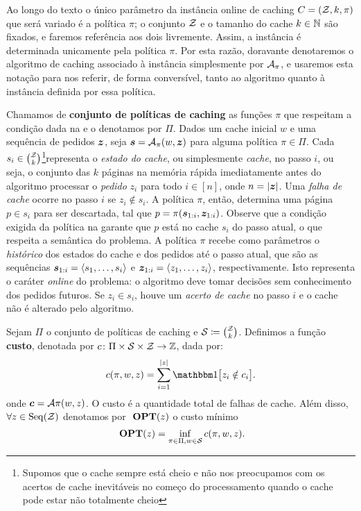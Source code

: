 \newpage

Ao longo do texto o único parâmetro da instância online de caching \(C = (\mathcal{Z}, k, \pi)\) que será variado é a política \(\pi\); o conjunto \(\mathcal{Z}\) e o tamanho do cache \(k \in \mathbb{N}\) são fixados, e faremos referência aos dois livremente. Assim, a instância é determinada unicamente pela política \(\pi\). Por esta razão, doravante denotaremos o algoritmo de caching associado à instância simplesmente por \(\mathcal{A}_{\pi}\), e usaremos esta notação para nos referir, de forma conversível, tanto ao algoritmo quanto à instância definida por essa política.

Chamamos de \textbf{conjunto de políticas de caching} as funções \(\pi\) que respeitam a condição dada na  e o denotamos por \(\Pi\). Dados um cache inicial \(w\) e uma sequência de pedidos \(\bm{z}\), seja \(\bm{s} = \mathcal{A}_\pi(w, \bm{z})\) para alguma política \(\pi \in \Pi\). Cada \(s_i \in \binom{\mathcal{Z}}{k}\)\footnote{Supomos que o cache sempre está cheio e não nos preocupamos com os acertos de cache inevitáveis no começo do processamento quando o cache pode estar não totalmente cheio}representa o \emph{estado do cache}, ou simplesmente \emph{cache}, no passo \(i\), ou seja, o conjunto das \(k\) páginas na memória rápida imediatamente antes do algoritmo processar o \emph{pedido} \(z_i\) para todo \(i \in [n]\), onde \(n = |\bm{z}|\). Uma \emph{falha de cache} ocorre no passo \(i\) se \(z_i \notin s_i\). A política \(\pi\), então, determina uma página \(p \in s_i\) para ser descartada, tal que \(p = \pi(\bm{s}_{1:i}, \bm{z}_{1:i})\). Observe que a condição exigida da política na  garante que \(p\) está no cache \(s_i\) do passo atual, o que respeita a semântica do problema. A política \(\pi\) recebe como parâmetros o \emph{histórico} dos estados do cache e dos pedidos até o passo atual, que são as sequências \(\bm{s}_{1:i} = \langle s_1, \dotsc, s_i\rangle\) e \(\bm{z}_{1:i} = \langle z_1, \dotsc, z_i\rangle\), respectivamente. Isto representa o caráter \emph{online} do problema: o algoritmo deve tomar decisões sem conhecimento dos pedidos futuros. Se \(z_i \in s_i\), houve um \emph{acerto de cache} no passo \(i\) e o cache não é alterado pelo algoritmo.

\begin{definition}
  Sejam \(\Pi\) o conjunto de políticas de caching e \(\mathcal{S} \coloneq \binom{\mathcal{Z}}{k}\). Definimos a função \textbf{custo}, denotada por \(c \colon \Pi \times \mathcal{S} \times \mathcal{Z} \to \mathbb{Z}\), dada por:
  \begin{equation}
    c(\pi, w, z) = \sum_{i=1}^{|z|} \ind{z_i \notin c_i}.
  \end{equation}
  onde \(\bm{c} = \mathcal{A}\pi(w,z)\). O custo é a quantidade total de falhas de cache. Além disso, \(\forall z \in \operatorname{Seq}(\mathcal{Z})\) denotamos por \(\ \textbf{OPT}(z)\) o custo mínimo
  \begin{equation}
    \ \textbf{OPT}(z) = \inf_{\pi \in \Pi, w \in \mathcal{S}} c(\pi, w, z).
  \end{equation}
\end{definition}


